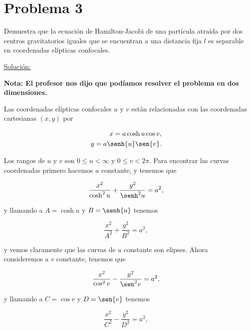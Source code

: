 \documentclass[a4paper,10pt]{article}
\numberwithin{equation}{section}
\begin{document}
\section{Problema 3}

Demuestra que la ecuación de Hamilton-Jacobi de una partícula atraída por dos centros
gravitatorios iguales que se encuentran a una distancia fija $l$ es separable en coordenadas 
elípticas confocales. 

\vspace{.3cm}

\underline{Solución:} \vspace{.3cm}

\textbf{Nota: El profesor nos dijo que podíamos resolver el problema en dos dimensiones.}

\vspace{.3cm}

Las coordenadas elípticas confocales $u$ y $v$ están relacionadas con las coordenadas 
cartesianas $(x,y)$ por 

\begin{align}
 x = a\cosh{u}\cos{v}, \\
 y = a\senh{u}\sen{v}.
\end{align}

Los rangos de $u$ y $v$ son $0 \leq u < \infty$ y $0 \leq v < 2\pi$. Para encontrar
las curvas coordenadas primero hacemos $u$ constante, y tenemos que 

\begin{equation}
 \frac{x^2}{\cosh^2{u}} + \frac{y^2}{\senh^2{u}} = a^2,
 \label{eq:uelipse}
\end{equation}

y llamando a $A = \cosh{u}$ y $B = \senh{u}$ tenemos 

\begin{equation}
 \frac{x^2}{A^2} + \frac{y^2}{B^2} = a^2,
\end{equation}

y vemos claramente que las curvas de $u$ constante son elipses. Ahora consideremos 
a $v$ constante, tenemos que 

\begin{equation}
 \frac{x^2}{\cos^2{v}} - \frac{y^2}{\sen^2{v}} = a^2,
 \label{eq:vhiperbola}
\end{equation}

y llamando a $C = \cos{v}$ y $D = \sen{v}$ tenemos 

\begin{equation}
 \frac{x^2}{C^2} - \frac{y^2}{D^2} = a^2,
\end{equation}
\end{document}
